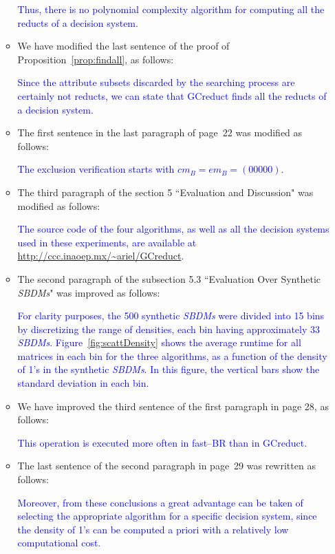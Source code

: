 \documentclass{letter}
\begin{document}
\begin{letter}{}
\begin{enumerate}
\begin{itemize}
		\textcolor{blue}{Thus, there is no polynomial complexity algorithm for computing all the reducts of a decision system.}
		
		\item We have modified the last sentence of the proof of Proposition~\ref{prop:findall}, as follows:
		
		\textcolor{blue}{Since the attribute subsets discarded by the searching process are certainly not reducts, we can state that GCreduct finds all the reducts of a decision system.}
		
		\item The first sentence in the last paragraph of page~22 was modified as follows:
		
		\textcolor{blue}{The exclusion verification starts with $cm_B = em_B = (00000)$.}
		
		\item The third paragraph of the section 5 ``Evaluation and Discussion" was modified as follows:
		
		\textcolor{blue}{The source code of the four algorithms, as well as all the decision systems used in these experiments, are available at \url{http://ccc.inaoep.mx/~ariel/GCreduct}.}
		
		\item The second paragraph of the subsection 5.3 ``Evaluation Over Synthetic \textit{SBDMs}" was improved as follows:
		
		\textcolor{blue}{For clarity purposes, the 500 synthetic \textit{SBDMs} were divided into 15 bins by discretizing the range of densities, each bin having approximately 33 \textit{SBDMs}. Figure~\ref{fig:scattDensity} shows the average runtime for all  matrices in each bin for the three algorithms, as a function of the density of 1's in the synthetic \textit{SBDMs}. In this figure, the vertical bars show the standard deviation in each bin.}
		
		\item We have improved the third sentence of the first paragraph in page 28, as follows:
		
		\textcolor{blue}{This operation is executed more often in fast--BR than in GCreduct.}
		
		\item The last sentence of the second paragraph in page~29 was rewritten as follows:
		
		\textcolor{blue}{Moreover, from these conclusions a great advantage can be taken of selecting the appropriate algorithm for a specific decision system, since the density of 1's can be computed a priori with a relatively low computational cost.}
		

\end{itemize}
\end{enumerate}
\end{letter}
\end{document}
